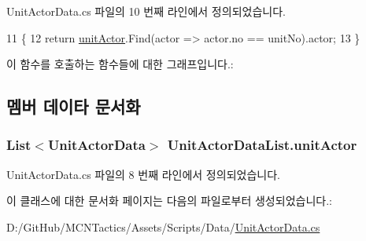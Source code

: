 Unit\+Actor\+Data.\+cs 파일의 10 번째 라인에서 정의되었습니다.


\begin{DoxyCode}
11     \{
12         \textcolor{keywordflow}{return} \hyperlink{class_unit_actor_data_list_a77e515548ec7edc9618908dd45cafa09}{unitActor}.Find(actor => actor.no == unitNo).actor;
13     \}
\end{DoxyCode}


이 함수를 호출하는 함수들에 대한 그래프입니다.\+:




\subsection{멤버 데이타 문서화}
\subsubsection[{\texorpdfstring{unit\+Actor}{unitActor}}]{\setlength{\rightskip}{0pt plus 5cm}List$<${\bf Unit\+Actor\+Data}$>$ Unit\+Actor\+Data\+List.\+unit\+Actor}\hypertarget{class_unit_actor_data_list_a77e515548ec7edc9618908dd45cafa09}{}\label{class_unit_actor_data_list_a77e515548ec7edc9618908dd45cafa09}


Unit\+Actor\+Data.\+cs 파일의 8 번째 라인에서 정의되었습니다.



이 클래스에 대한 문서화 페이지는 다음의 파일로부터 생성되었습니다.\+:\begin{DoxyCompactItemize}
\item 
D\+:/\+Git\+Hub/\+M\+C\+N\+Tactics/\+Assets/\+Scripts/\+Data/\hyperlink{_unit_actor_data_8cs}{Unit\+Actor\+Data.\+cs}\end{DoxyCompactItemize}
